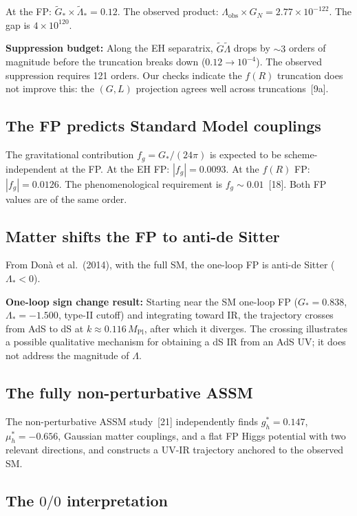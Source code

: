 \documentclass[12pt]{article}
\begin{document}
At the FP: $\tilde G_*\times\tilde\Lambda_* = 0.12$. The observed product: $\Lambda_{\text{obs}}\times G_N = 2.77\times10^{-122}$. The gap is $4\times10^{120}$.

\textbf{Suppression budget:} Along the EH separatrix, $\tilde G\tilde\Lambda$ drops by $\sim3$ orders of magnitude before the truncation breaks down ($0.12\to10^{-4}$). The observed suppression requires 121 orders. Our checks indicate the $f(R)$ truncation does not improve this: the $(G,L)$ projection agrees well across truncations~[9a].

\subsection{The FP predicts Standard Model couplings}

The gravitational contribution $f_g = G_*/(24\pi)$ is expected to be scheme-independent at the FP. At the EH FP: $|f_g|=0.0093$. At the $f(R)$ FP: $|f_g|=0.0126$. The phenomenological requirement is $f_g\sim0.01$~[18]. Both FP values are of the same order.

\subsection{Matter shifts the FP to anti-de Sitter}

From Don\`{a} et al.\ (2014), with the full SM, the one-loop FP is anti-de Sitter ($\Lambda_*<0$).

\textbf{One-loop sign change result:} Starting near the SM one-loop FP ($G_*=0.838$, $\Lambda_*=-1.500$, type-II cutoff) and integrating toward IR, the trajectory crosses from AdS to dS at $k\approx0.116\,M_{\text{Pl}}$, after which it diverges. The crossing illustrates a possible qualitative mechanism for obtaining a dS IR from an AdS UV; it does not address the magnitude of $\Lambda$.

\subsection{The fully non-perturbative ASSM}

The non-perturbative ASSM study~[21] independently finds $g_h^*=0.147$, $\mu_h^*=-0.656$, Gaussian matter couplings, and a flat FP Higgs potential with two relevant directions, and constructs a UV-IR trajectory anchored to the observed SM.

\subsection{The $0/0$ interpretation}
\end{document}
